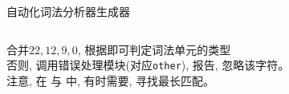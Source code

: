 
\begin{frame}{}
  \begin{center}
    自动化词法分析器生成器
  \end{center}
\end{frame}

\begin{frame}{}
  \begin{columns}
  \end{columns}
\end{frame}

\begin{frame}{}
  \begin{columns}
      \begin{center}
      \end{center}
      \begin{center}
      \end{center}
  \end{columns}

  \vspace{0.30cm}
  \begin{center}
     合并$22, 12, 9, 0$, 根据即可判定词法单元的类型 \\[4pt]
    否则, 调用错误处理模块(对应\texttt{other}), 报告, 忽略该字符。 \\[4pt]
    注意, 在 \floatnum{} 与 \scinum{} 中, 有时需要, 寻找最长匹配。
  \end{center}
\end{frame}


